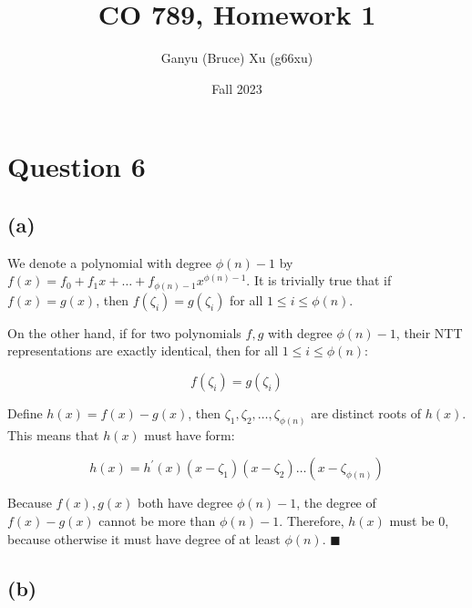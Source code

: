 \documentclass{article}
\title{CO 789, Homework 1}
\author{Ganyu (Bruce) Xu (g66xu)}
\date{Fall 2023}
\begin{document}

\section*{Question 6}
\subsection*{(a)}
We denote a polynomial with degree $\phi(n) - 1$ by $f(x) = f_0 + f_1x + \ldots + f_{\phi(n)-1}x^{\phi(n)-1}$. It is trivially true that if $f(x) = g(x)$, then $f(\zeta_i) = g(\zeta_i)$ for all $1 \leq i \leq \phi(n)$.

On the other hand, if for two polynomials $f, g$ with degree $\phi(n) - 1$, their NTT representations are exactly identical, then for all $1 \leq i \leq \phi(n)$:

$$
f(\zeta_i) = g(\zeta_i)
$$

Define $h(x) = f(x) - g(x)$, then $\zeta_1, \zeta_2, \ldots, \zeta_{\phi(n)}$ are distinct roots of $h(x)$. This means that $h(x)$ must have form:

$$
h(x) = h^\prime(x)(x - \zeta_1)(x - \zeta_2) \ldots (x - \zeta_{\phi(n)})
$$

Because $f(x), g(x)$ both have degree $\phi(n) - 1$, the degree of $f(x) - g(x)$ cannot be more than $\phi(n) - 1$. Therefore, $h(x)$ must be $0$, because otherwise it must have degree of at least $\phi(n)$. $\blacksquare$

\subsection*{(b)}
\end{document}
